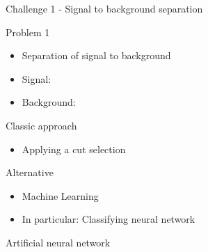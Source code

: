 \begin{frame}{Challenge 1 - Signal to background separation}
\begin{block}{Problem 1}
    \begin{itemize}
        \item Separation of signal to background
        \item Signal: \tW
        \item Background: \ttbar
    \end{itemize}
\end{block}
\begin{block}{Classic approach}
    \begin{itemize}
    \item Applying a cut selection
    \end{itemize}
\end{block}
\begin{block}{Alternative}
    \begin{itemize}
        \item Machine Learning
        \item In particular: Classifying neural network
    \end{itemize}
\end{block}
\end{frame}

\begin{frame}[c]
\begin{center}
\Huge Artificial neural network
\end{center}
\end{frame}

